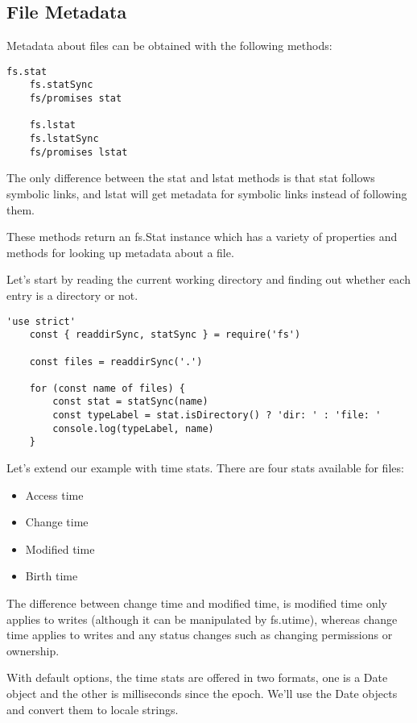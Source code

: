 \documentclass{scrartcl}
\begin{document}
\subsection{File Metadata}

Metadata about files can be obtained with the following methods:


\begin{lstlisting}[style=ES6]
    fs.stat
    fs.statSync
    fs/promises stat

    fs.lstat
    fs.lstatSync
    fs/promises lstat
\end{lstlisting}

The only difference between the stat and lstat methods is that stat follows symbolic links, and lstat will get metadata for symbolic links instead of following them.

These methods return an fs.Stat instance which has a variety of properties and methods for looking up metadata about a file.

Let's start by reading the current working directory and finding out whether each entry is a directory or not.

\begin{lstlisting}[style=ES6]
    'use strict'
    const { readdirSync, statSync } = require('fs')

    const files = readdirSync('.')

    for (const name of files) {
        const stat = statSync(name)
        const typeLabel = stat.isDirectory() ? 'dir: ' : 'file: '
        console.log(typeLabel, name)
    }

\end{lstlisting}

Let's extend our example with time stats. There are four stats available for files:

\begin{itemize}
    \item Access time
    \item Change time
    \item Modified time
    \item Birth time
\end{itemize}

The difference between change time and modified time, is modified time only applies to writes (although it can be manipulated by fs.utime), whereas change time applies to writes and any status changes such as changing permissions or ownership.

With default options, the time stats are offered in two formats, one is a Date object and the other is milliseconds since the epoch. We'll use the Date objects and convert them to locale strings.
\end{document}
